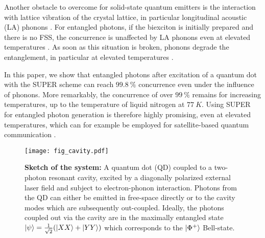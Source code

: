 \documentclass[%
 reprint,superscriptaddress,
 amsmath,amssymb,
 aps]{revtex4-2}
\begin{document}
Another obstacle to overcome for solid-state quantum emitters is the interaction with lattice vibration of the crystal lattice, in particular longitudinal acoustic (LA) phonons \cite{ramsay2010phonon, luker2019review,cosacchi2021accuracy,vannucci2022phonon}. For entangled photons, if the biexciton is initially prepared and there is no FSS, the concurrence is unaffected by LA phonons even at elevated temperatures \cite{carmele,seidelmann2019from}. As soon as this situation is broken, phonons degrade the entanglement, in particular at elevated temperatures \cite{heinze2017polarization,Seidelmann2023,lehner2023beyond}. 

In this paper, we show that entangled photons after excitation of a quantum dot with the SUPER scheme can reach $\SI{99.8}{\percent}$ concurrence even under the influence of phonons. More remarkably, the concurrence of over $\SI{99}{\percent}$ remains for increasing temperatures, up to the temperature of liquid nitrogen at $\SI{77}{K}$. Using SUPER for entangled photon generation is therefore highly promising, even at elevated temperatures, which can for example be employed for satellite-based quantum communication \cite{yin2020entanglement}.

\begin{figure}
    \centering
    \texttt{[image: fig\_cavity.pdf]}
    \caption{\textbf{Sketch of the system:} A quantum dot (QD) coupled to a two-photon resonant cavity, excited by a diagonally polarized external laser field and subject to electron-phonon interaction. Photons from the QD can either be emitted in free-space directly or to the cavity modes which are subsequently out-coupled. Ideally, the photons coupled out via the cavity are in the maximally entangled state $\ket{\psi} = \frac{1}{\sqrt{2}}(\ket{XX} + \ket{YY})$ which corresponds to the $\ket{\Phi^+}$ Bell-state.}
    \label{fig:fig_cavity}
\end{figure}
\end{document}

